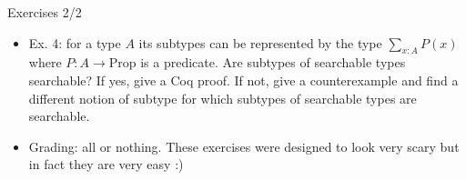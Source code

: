 \documentclass{beamer}
\begin{document}
\begin{frame}{Exercises 2/2}
\begin{itemize}
	\item Ex. 4: for a type $A$ its subtypes can be represented by the type $\displaystyle \sum_{x : A} P(x)$ where $P : A \to \text{Prop}$ is a predicate. Are subtypes of searchable types searchable? If yes, give a Coq proof. If not, give a counterexample and find a different notion of subtype for which subtypes of searchable types are searchable.
	\item Grading: all or nothing. These exercises were designed to look very scary but in fact they are very easy :)
\end{itemize}
\end{frame}
\end{document}
